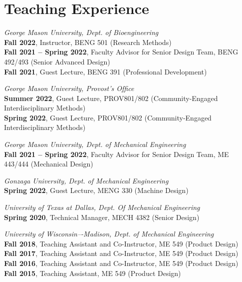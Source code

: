 \documentclass[letterpaper, 10pt]{article}
\begin{document}
\section{Teaching Experience}

\textit{George Mason University, Dept. of Bioengineering}\\
\textbf{Fall 2022}, Instructor, BENG 501 (Research Methods)\\
\textbf{Fall 2021 -- Spring 2022}, Faculty Advisor for Senior Design Team, BENG 492/493 (Senior Advanced Design)\\ 
\textbf{Fall 2021}, Guest Lecture, BENG 391 (Professional Development)

\bigskip

\textit{George Mason University, Provost’s Ofﬁce}\\
\textbf{Summer 2022}, Guest Lecture, PROV801/802 (Community-Engaged Interdisciplinary Methods)\\
\textbf{Spring 2022}, Guest Lecture, PROV801/802 (Community-Engaged Interdisciplinary Methods)

\bigskip

\textit{George Mason University, Dept. of Mechanical Engineering}\\
\textbf{Fall 2021 -- Spring 2022}, Faculty Advisor for Senior Design Team, ME 443/444 (Mechanical Design)

\bigskip

\textit{Gonzaga University, Dept. of Mechanical Engineering}\\
\textbf{Spring 2022}, Guest Lecture, MENG 330 (Machine Design)

\bigskip

\textit{University of Texas at Dallas, Dept. Of Mechanical Engineering}\\
\textbf{Spring 2020}, Technical Manager, MECH 4382 (Senior Design)

\bigskip

\textit{University of Wisconsin–-Madison, Dept. of Mechanical Engineering}\\
\textbf{Fall 2018}, Teaching Assistant and Co-Instructor, ME 549 (Product Design)\\
\textbf{Fall 2017}, Teaching Assistant and Co-Instructor, ME 549 (Product Design)\\ 
\textbf{Fall 2016}, Teaching Assistant and Co-Instructor, ME 549 (Product Design)\\ 
\textbf{Fall 2015}, Teaching Assistant, ME 549 (Product Design)
\end{document}
